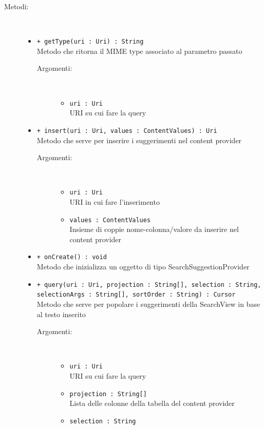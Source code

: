 \documentclass[../DefinizioneDiProdotto.tex]{subfiles}
\begin{document}
\begin{description}
\begin{itemize}
\end{itemize}
\item[Metodi:] \
\begin{itemize}
\item \texttt{+ getType(uri : Uri) : String}\\
Metodo che ritorna il MIME type associato al parametro passato
 \begin{description}
\item[Argomenti:] \
\begin{itemize}
\item \texttt{uri : Uri}\\
URI su cui fare la query\end{itemize}
\end{description}
\item \texttt{+ insert(uri : Uri, values : ContentValues) : Uri}\\
Metodo che serve per inserire i suggerimenti nel content provider
 \begin{description}
\item[Argomenti:] \
\begin{itemize}
\item \texttt{uri : Uri}\\
URI in cui fare l'inserimento\item \texttt{values : ContentValues}\\
Insieme di coppie nome-colonna/valore da inserire nel content provider \end{itemize}
\end{description}
\item \texttt{+ onCreate() : void}\\
Metodo che inizializza un oggetto di tipo SearchSuggestionProvider
 \item \texttt{+ query(uri : Uri, projection : String[], selection : String, selectionArgs : String[], sortOrder : String) : Cursor}\\
Metodo che serve per popolare i suggerimenti della SearchView in base al testo inserito
 \begin{description}
\item[Argomenti:] \
\begin{itemize}
\item \texttt{uri : Uri}\\
URI su cui fare la query\item \texttt{projection : String[]}\\
Lista delle colonne della tabella del content provider\item \texttt{selection : String}\\

\end{itemize}
\end{description}
\end{itemize}
\end{description}
\end{document}
